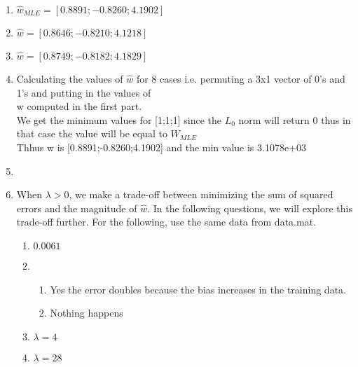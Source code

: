 \begin{enumerate}
\item $\hat{w}_{MLE} = [0.8891;-0.8260;4.1902]$ 
\item $\hat{w} = [0.8646;-0.8210;4.1218]$ 
\item $\hat{w} = [0.8749;-0.8182;4.1829]$
\item Calculating the values of $\hat{w}$ for 8 cases i.e. permuting a 3x1 vector of 0's and 1's and putting in the values of\\
	w computed in the first part.\\
	We get the minimum values for [1;1;1] since the $L_0$ norm will return 0 thus in that case the value will be equal to $W_{MLE}$\\
	Thhus w is [0.8891;-0.8260;4.1902] and the min value is    3.1078e+03\\

\item 

\item When $\lambda > 0$, we make a trade-off between minimizing the sum of squared errors and the magnitude of $\hat{w}$. In the following questions, we will explore this trade-off further. For the following, use the same data from data.mat.
\begin{enumerate}
\item $0.0061$

\item
\begin{enumerate}
	\item Yes the error doubles because the bias increases in the training data.

	\item Nothing happens

\end{enumerate}

\item $\lambda = 4$

\item $\lambda = 28$

\end{enumerate}
\end{enumerate}
